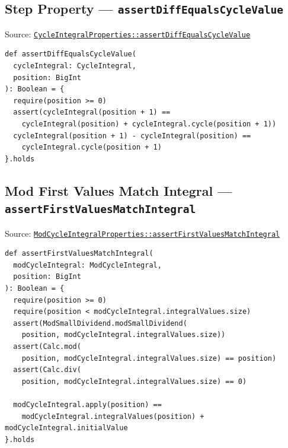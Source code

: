 \subsection{Step Property --- \texorpdfstring{\texttt{assert\allowbreak Diff\allowbreak Equals\allowbreak Cycle\allowbreak Value}}{assertDiffEqualsCycleValue}}

{\raggedright Source: \href{https://github.com/thiagomata/prime-numbers/blob/integral-cycle-article-v1.0.0/src/main/scala/v1/chapter4/cycle/integral/recursive/properties/CycleIntegralProperties.scala}{\texttt{Cycle\allowbreak Integral\allowbreak Properties::assert\allowbreak Diff\allowbreak Equals\allowbreak Cycle\allowbreak Value}}\par}

\begin{lstlisting}[style=scala]
def assertDiffEqualsCycleValue(
  cycleIntegral: CycleIntegral,
  position: BigInt
): Boolean = {
  require(position >= 0)
  assert(cycleIntegral(position + 1) ==
    cycleIntegral(position) + cycleIntegral.cycle(position + 1))
  cycleIntegral(position + 1) - cycleIntegral(position) ==
    cycleIntegral.cycle(position + 1)
}.holds
\end{lstlisting}

\subsection{Mod First Values Match Integral --- \texorpdfstring{\texttt{assert\allowbreak First\allowbreak Values\allowbreak Match\allowbreak Integral}}{assertFirstValuesMatchIntegral}}

{\raggedright Source: \href{https://github.com/thiagomata/prime-numbers/blob/integral-cycle-article-v1.0.0/src/main/scala/v1/chapter4/cycle/integral/mod/ModCycleIntegralProperties.scala}{\texttt{Mod\allowbreak Cycle\allowbreak Integral\allowbreak Properties::assert\allowbreak First\allowbreak Values\allowbreak Match\allowbreak Integral}}\par}

\begin{lstlisting}[style=scala]
def assertFirstValuesMatchIntegral(
  modCycleIntegral: ModCycleIntegral,
  position: BigInt
): Boolean = {
  require(position >= 0)
  require(position < modCycleIntegral.integralValues.size)
  assert(ModSmallDividend.modSmallDividend(
    position, modCycleIntegral.integralValues.size))
  assert(Calc.mod(
    position, modCycleIntegral.integralValues.size) == position)
  assert(Calc.div(
    position, modCycleIntegral.integralValues.size) == 0)

  modCycleIntegral.apply(position) ==
    modCycleIntegral.integralValues(position) + modCycleIntegral.initialValue
}.holds
\end{lstlisting}

